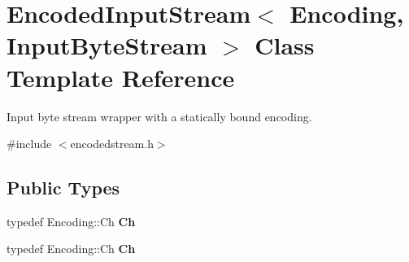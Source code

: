 \hypertarget{class_encoded_input_stream}{}\section{Encoded\+Input\+Stream$<$ Encoding, Input\+Byte\+Stream $>$ Class Template Reference}
\label{class_encoded_input_stream}


Input byte stream wrapper with a statically bound encoding.  




{\ttfamily \#include $<$encodedstream.\+h$>$}

\subsection*{Public Types}
\begin{DoxyCompactItemize}
\item 
typedef Encoding\+::\+Ch {\bfseries Ch}\hypertarget{class_encoded_input_stream_acc387a1364390da244bbb1ab07bdceca}{}\label{class_encoded_input_stream_acc387a1364390da244bbb1ab07bdceca}

\item 
typedef Encoding\+::\+Ch {\bfseries Ch}\hypertarget{class_encoded_input_stream_acc387a1364390da244bbb1ab07bdceca}{}\label{class_encoded_input_stream_acc387a1364390da244bbb1ab07bdceca}

\end{DoxyCompactItemize}
